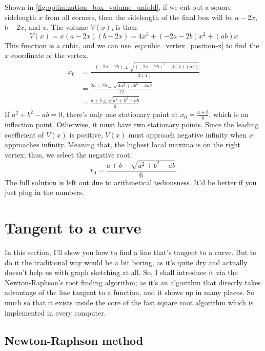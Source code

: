 Shown in \cref{fig:optimization_box_volume_unfold}, if we cut out a square sidelength $x$ from all corners, then the sidelength of the final box will be $a - 2x$, $b - 2x$, and $x$. The volume $V(x)$, is then
\begin{equation}
	V(x) = x(a - 2x)(b - 2x) = 4x^3 + (- 2a - 2b)x^2 + (ab)x
\end{equation}
This function is a cubic, and we can use \cref{eq:cubic_vertex_position-x} to find the $x$ coordinate of the vertex.
\begin{align}
	x_0 &= \frac{- (- 2a - 2b) \pm \sqrt{(- 2a - 2b)^2 - 3(4)(ab)}}{3(4)} \\
		&= \frac{2a + 2b \pm \sqrt{4a^2 + 4b^2 - 4ab}}{12} \\
		&= \frac{a + b \pm \sqrt{a^2 + b^2 - ab}}{6}
\end{align}
If $a^2 + b^2 - ab = 0$, there's only one stationary point at $x_0 = \frac{a + b}{6}$, which is an inflection point. Otherwise, it must have two stationary points. Since the leading coefficient of $V(x)$ is positive, $V(x)$ must approach negative infinity when $x$ approaches infinity. Meaning that, the highest local maxima is on the right vertex; thus, we select the negative root:
\begin{equation}
	x_0 = \frac{a + b - \sqrt{a^2 + b^2 - ab}}{6}.
\end{equation}
The full solution is left out due to arithmetical tediousness. It'd be better if you just plug in the numbers.

\section{Tangent to a curve}

In this section, I'll show you how to find a line that's tangent to a curve. But to do it the traditional way would be a bit boring, as it's quite dry and actually doesn't help us with graph sketching at all. So, I shall introduce it via the Newton-Raphson's root finding algorithm; as it's an algorithm that directly takes advantage of the line tangent to a function, and it shows up in many places. So much so that it exists inside the core of the fast square root algorithm which is implemented in every computer.

\subsection{Newton-Raphson method}

